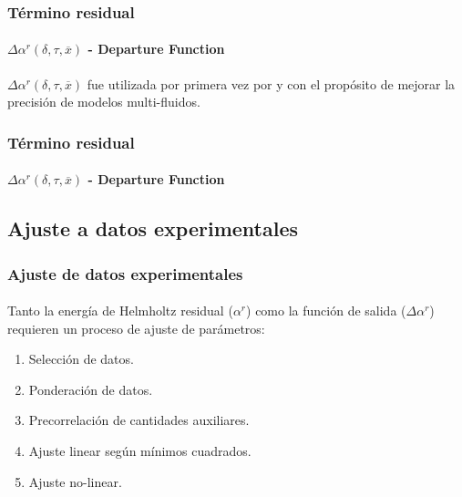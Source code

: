 \documentclass[aspectratio=1610,multi,rgb]{beamer}
\begin{document}
\begin{frame}
	\frametitle{Término residual}
	\framesubtitle{	$\Delta\alpha^r(\delta,\tau,\overline{x})$
	- Departure Function}
	$\Delta\alpha^r(\delta,\tau,\overline{x})$ fue utilizada por primera
	vez por \cite{tillner_93} y \cite{lemmon_96} con el propósito de
	mejorar la precisión de modelos multi-fluidos. 
\end{frame}
\begin{frame}
	\frametitle{Término residual}
	\framesubtitle{	$\Delta\alpha^r(\delta,\tau,\overline{x})$
	- Departure Function}
\end{frame}

\subsection{Ajuste a datos experimentales}
\begin{frame}
	\frametitle{Ajuste de datos experimentales}
	\framesubtitle{}
	Tanto la energía de Helmholtz residual ($\alpha^r$) como la función de
	salida ($\Delta\alpha^r$) requieren un proceso de ajuste de parámetros:
	\begin{block}{}
	\begin{enumerate}
		\item Selección de datos.
		\item Ponderación de datos.
		\item Precorrelación de cantidades auxiliares.
		\item Ajuste linear según mínimos cuadrados.
		\item Ajuste no-linear.
	\end{enumerate}
	\end{block}
\end{frame}
\end{document}
